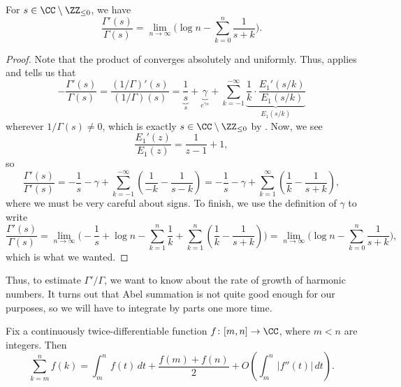 \documentclass[../notes.tex]{subfiles}
\begin{document}
\begin{corollary} \label{cor:bound-log-gamma-deriv}
	For $s\in\CC\setminus\ZZ_{\le0}$, we have
	\[\frac{\Gamma'(s)}{\Gamma(s)}=\lim_{n\to\infty}\Bigg(\log n-\sum_{k=0}^n\frac1{s+k}\Bigg).\]
\end{corollary}
\begin{proof}
	Note that the product of  converges absolutely and uniformly. Thus,  applies and tells us that
	\[-\frac{\Gamma'(s)}{\Gamma(s)}=\frac{(1/\Gamma)'(s)}{(1/\Gamma)(s)}=\underbrace{\frac1s}_s+\underbrace{\gamma}_{e^{\gamma s}}+\sum_{k=-1}^{-\infty}\underbrace{\frac1k\cdot\frac{E_1'(s/k)}{E_1(s/k)}}_{E_1(s/k)}\]
	wherever $1/\Gamma(s)\ne0$, which is exactly $s\in\CC\setminus\ZZ_{\le0}$ by . Now, we see
	\[\frac{E_1'(z)}{E_1(z)}=\frac{1}{z-1}+1,\]
	so
	\[\frac{\Gamma'(s)}{\Gamma'(s)}=-\frac1s-\gamma+\sum_{k=-1}^{-\infty}\left(\frac1{-k}-\frac1{s-k}\right)=-\frac1s-\gamma+\sum_{k=1}^{\infty}\left(\frac1{k}-\frac1{s+k}\right),\]
	where we must be very careful about signs. To finish, we use the definition of $\gamma$ to write
	\[\frac{\Gamma'(s)}{\Gamma(s)}=\lim_{n\to\infty}\Bigg(-\frac1s+\log n-\sum_{k=1}^{n}\frac1k+\sum_{k=1}^n\left(\frac1{k}-\frac1{s+k}\right)\Bigg)=\lim_{n\to\infty}\Bigg(\log n-\sum_{k=0}^n\frac1{s+k}\Bigg),\]
	which is what we wanted.
\end{proof}
Thus, to estimate $\Gamma'/\Gamma$, we want to know about the rate of growth of harmonic numbers. It turns out that Abel summation is not quite good enough for our purposes, so we will have to integrate by parts one more time.
\begin{lemma} \label{lem:trapezoid}
	Fix a continuously twice-differentiable function $f\colon[m,n]\to\CC$, where $m<n$ are integers. Then
	\[\sum_{k=m}^nf(k)=\int_m^nf(t)\,dt+\frac{f(m)+f(n)}2+O\left(\int_m^n|f''(t)|\,dt\right).\]
\end{lemma}
\end{document}
